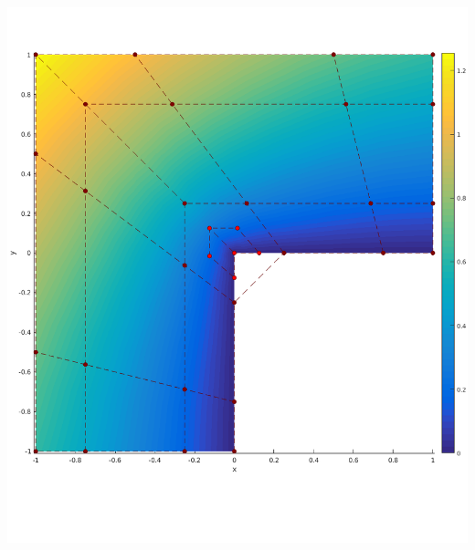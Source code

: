 \documentclass{beamer}
\begin{document}
\begin{frame}
\begin{minipage}{0.49\textwidth}
		\includegraphics[scale=0.24]{pics/lshape/lshape_controlnet_2.png}
	\end{minipage}
\end{frame}
\end{document}
